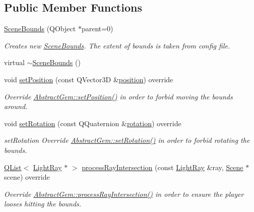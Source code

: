 \subsection*{Public Member Functions}
\begin{DoxyCompactItemize}
\item 
\hyperlink{class_scene_bounds_a26e24012c6a45d3412745828b037dae4}{Scene\+Bounds} (Q\+Object $\ast$parent=0)
\begin{DoxyCompactList}\small\item\em Creates new \hyperlink{class_scene_bounds}{Scene\+Bounds}. The extent of bounds is taken from config file. \end{DoxyCompactList}\item 
virtual \hyperlink{class_scene_bounds_a625ef0d42c9133022a636ba5a57ad840}{$\sim$\+Scene\+Bounds} ()
\item 
void \hyperlink{class_scene_bounds_a26db5e7928d3ac7d0257dc52e1ed4e77}{set\+Position} (const Q\+Vector3\+D \&\hyperlink{class_abstract_gem_accd665898ada9bc95c886bfbcf56d9a8}{position}) override
\begin{DoxyCompactList}\small\item\em Override \hyperlink{class_abstract_gem_aaf11fa4b522dc334ebed4f2d031a3e2b}{Abstract\+Gem\+::set\+Position()} in order to forbid moving the bounds around. \end{DoxyCompactList}\item 
void \hyperlink{class_scene_bounds_a2e7b2f2e66700b414584ca6b407faf72}{set\+Rotation} (const Q\+Quaternion \&\hyperlink{class_abstract_gem_a6d85928549d64d369864716dbe2c716b}{rotation}) override
\begin{DoxyCompactList}\small\item\em set\+Rotation Override \hyperlink{class_abstract_gem_afce4d09f74fec117d27b11a220eee6b9}{Abstract\+Gem\+::set\+Rotation()} in order to forbid rotating the bounds. \end{DoxyCompactList}\item 
\hyperlink{class_q_list}{Q\+List}$<$ \hyperlink{class_light_ray}{Light\+Ray} $\ast$ $>$ \hyperlink{class_scene_bounds_aeac6aafe6081e8efd6b4180e86346dc0}{process\+Ray\+Intersection} (const \hyperlink{class_light_ray}{Light\+Ray} \&ray, \hyperlink{class_scene}{Scene} $\ast$scene) override
\begin{DoxyCompactList}\small\item\em Override \hyperlink{class_abstract_gem_ab4f3c6d38acbe59a610c67588e4944d7}{Abstract\+Gem\+::process\+Ray\+Intersection()} in order to ensure the player looses hitting the bounds. \end{DoxyCompactList}\end{DoxyCompactItemize}
